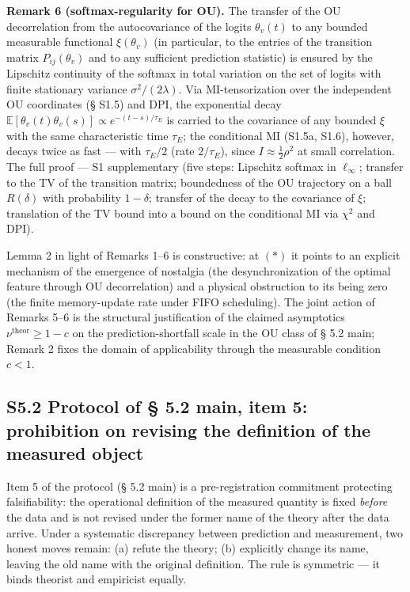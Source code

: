 \documentclass[pdflatex,sn-mathphys-ay]{sn-jnl}
\begin{document}
\textbf{Remark 6 (softmax-regularity for OU).} The transfer of the OU decorrelation from the autocovariance of the logits \(\theta_v(t)\) to any bounded measurable functional \(\xi(\theta_v)\) (in particular, to the entries of the transition matrix \(P_{ij}(\theta_v)\) and to any sufficient prediction statistic) is ensured by the Lipschitz continuity of the softmax in total variation on the set of logits with finite stationary variance \(\sigma^2/(2\lambda)\). Via MI-tensorization over the independent OU coordinates (§ S1.5) and DPI, the exponential decay \(\mathbb{E}[\theta_v(t)\theta_v(s)] \propto e^{-(t-s)/\tau_E}\) is carried to the covariance of any bounded \(\xi\) with the same characteristic time \(\tau_E\); the conditional MI (S1.5a, S1.6), however, decays twice as fast --- with \(\tau_E/2\) (rate \(2/\tau_E\)), since \(I \approx \tfrac{1}{2}\rho^2\) at small correlation. The full proof --- S1 supplementary (five steps: Lipschitz softmax in \(\ell_\infty\); transfer to the TV of the transition matrix; boundedness of the OU trajectory on a ball \(R(\delta)\) with probability \(1-\delta\); transfer of the decay to the covariance of \(\xi\); translation of the TV bound into a bound on the conditional MI via \(\chi^2\) and DPI).



Lemma 2 in light of Remarks 1--6 is constructive: at \((*)\) it points to an explicit mechanism of the emergence of nostalgia (the desynchronization of the optimal feature through OU decorrelation) and a physical obstruction to its being zero (the finite memory-update rate under FIFO scheduling). The joint action of Remarks 5--6 is the structural justification of the claimed asymptotics \(\nu^{\text{theor}} \ge 1 - c\) on the prediction-shortfall scale in the OU class of § 5.2 main; Remark 2 fixes the domain of applicability through the measurable condition \(c < 1\).



\subsection*{S5.2 Protocol of § 5.2 main, item 5: prohibition on revising the definition of the measured object}\label{s5.2-protocol-of-5.2-main-item-5-prohibition-on-revising-the-definition-of-the-measured-object}



Item 5 of the protocol (§ 5.2 main) is a pre-registration commitment protecting falsifiability: the operational definition of the measured quantity is fixed \emph{before} the data and is not revised under the former name of the theory after the data arrive. Under a systematic discrepancy between prediction and measurement, two honest moves remain: (a) refute the theory; (b) explicitly change its name, leaving the old name with the original definition. The rule is symmetric --- it binds theorist and empiricist equally.
\end{document}
